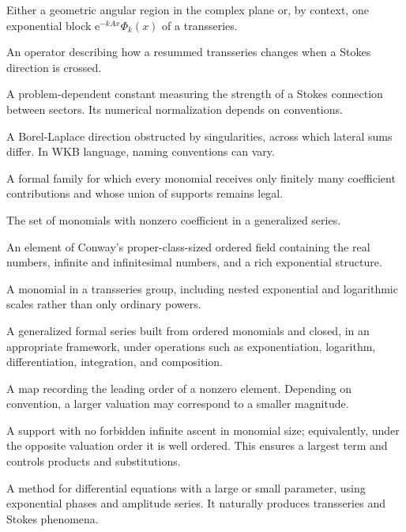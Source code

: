 \documentclass[11pt,openany]{book}
\theoremstyle{plain}
\theoremstyle{definition}
\theoremstyle{remark}
\newcommand{\e}{\mathrm{e}}
\begin{document}
\begin{description}[style=nextline,itemsep=0.75em]
\item[Sector]
Either a geometric angular region in the complex plane or, by context, one exponential block $\e^{-kAx}\Phi_k(x)$ of a transseries.

\item[Stokes automorphism]
An operator describing how a resummed transseries changes when a Stokes direction is crossed.

\item[Stokes constant]
A problem-dependent constant measuring the strength of a Stokes connection between sectors. Its numerical normalization depends on conventions.

\item[Stokes direction]
A Borel-Laplace direction obstructed by singularities, across which lateral sums differ. In WKB language, naming conventions can vary.

\item[Summable family]
A formal family for which every monomial receives only finitely many coefficient contributions and whose union of supports remains legal.

\item[Support]
The set of monomials with nonzero coefficient in a generalized series.

\item[Surreal number]
An element of Conway's proper-class-sized ordered field containing the real numbers, infinite and infinitesimal numbers, and a rich exponential structure.

\item[Transmonomial]
A monomial in a transseries group, including nested exponential and logarithmic scales rather than only ordinary powers.

\item[Transseries]
A generalized formal series built from ordered monomials and closed, in an appropriate framework, under operations such as exponentiation, logarithm, differentiation, integration, and composition.

\item[Valuation]
A map recording the leading order of a nonzero element. Depending on convention, a larger valuation may correspond to a smaller magnitude.

\item[Well-based support]
A support with no forbidden infinite ascent in monomial size; equivalently, under the opposite valuation order it is well ordered. This ensures a largest term and controls products and substitutions.

\item[WKB method]
A method for differential equations with a large or small parameter, using exponential phases and amplitude series. It naturally produces transseries and Stokes phenomena.
\end{description}
\end{document}
